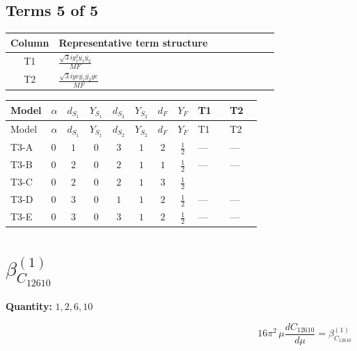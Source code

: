 \documentclass[8pt]{article}
\begin{document}
\begin{landscape}
\subsection*{Terms 5 of 5}
\begin{center}
\begin{tabular}{@{}c >{\raggedright\arraybackslash}p{0.82\linewidth}@{}}
\toprule
Column & Representative term structure \\
\midrule
T1 & \(\displaystyle \frac{\sqrt{3} i g_{1}^{2} \overline{y_{1}} \overline{y_{2}}}{MF}\) \\
\midrule
T2 & \(\displaystyle \frac{\sqrt{3} i ye \overline{y_{1}} \overline{y_{2}} \overline{ye}}{MF}\) \\
\midrule
\bottomrule
\end{tabular}
\end{center}
\smallskip
\tiny
\begin{longtable}{@{}llcccccc >{\raggedright\arraybackslash}p{0.21\linewidth} >{\raggedright\arraybackslash}p{0.21\linewidth}@{}}
\toprule
Model & $\alpha$ & $d_{S_1}$ & $Y_{S_1}$ & $d_{S_2}$ & $Y_{S_2}$ & $d_F$ & $Y_F$ & T1 & T2 \\
\midrule
\endfirsthead
\toprule
Model & $\alpha$ & $d_{S_1}$ & $Y_{S_1}$ & $d_{S_2}$ & $Y_{S_2}$ & $d_F$ & $Y_F$ & T1 & T2 \\
\midrule
\endhead
T3-A & $0$ & $1$ & $0$ & $3$ & $1$ & $2$ & $\frac{1}{2}$ & --- & --- \\
\midrule
T3-B & $0$ & $2$ & $0$ & $2$ & $1$ & $1$ & $\frac{1}{2}$ & --- & --- \\
\midrule
T3-C & $0$ & $2$ & $0$ & $2$ & $1$ & $3$ & $\frac{1}{2}$ & \scriptsize\adjustbox{max width=\linewidth}{$\begin{gathered} \frac{\sqrt{3} i g_{1}^{2} \overline{y_{1}} \overline{y_{2}}}{16 MF}\end{gathered}$} & \scriptsize\adjustbox{max width=\linewidth}{$\begin{gathered} - \frac{\sqrt{3} i ye \overline{y_{1}} \overline{y_{2}} \overline{ye}}{24 MF}\end{gathered}$} \\
\midrule
T3-D & $0$ & $3$ & $0$ & $1$ & $1$ & $2$ & $\frac{1}{2}$ & --- & --- \\
\midrule
T3-E & $0$ & $3$ & $0$ & $3$ & $1$ & $2$ & $\frac{1}{2}$ & --- & --- \\
\midrule
\bottomrule
\end{longtable}
\clearpage
\section*{$\beta_{C_{12610}}^{(1)}$}
\noindent\textbf{Quantity: }$\mathrm{1,2,6,10}$\par\smallskip
\[16\pi^2\,\mu\frac{d C_{12610}}{d\mu}=\beta_{C_{12610}}^{(1)}\]

\end{landscape}
\end{document}
